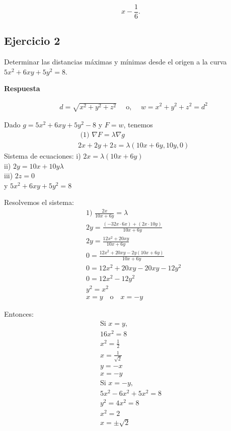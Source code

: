 \documentclass{report}
\begin{document}
\[
x - \frac{1}{6}.
\]

\newpage\subsection{Ejercicio 2}
Determinar las distancias máximas y mínimas desde el origen a la curva $5 x^{2}+6 x y+5 y^{2}=8$.

\textbf{Respuesta}

$$
\begin{aligned}
& d=\sqrt{x^{2}+y^{2}+z^{2}} \quad \text { o, } \quad w=x^{2}+y^{2}+z^{2}=d^{2}
\end{aligned}
$$

Dado $g=5 x^{2}+6 x y+5 y^{2}-8$ y $F=w$, tenemos 
$$
\begin{aligned}
& \text { (1) } \nabla F = \lambda \nabla g \\
& 2x+2y+2z = \lambda (10x + 6y, 10y, 0)
\end{aligned}
$$
Sistema de ecuaciones:
i) $2x = \lambda (10x + 6y)$ \\
ii) $2y = 10x + 10y\lambda$ \\
iii) $2z = 0$ \\ 
y $5x^2 + 6xy + 5y^2 = 8$

Resolvemos el sistema:
$$
\begin{aligned}
& \text{1) } \frac{2x}{10x + 6y} = \lambda \\
& 2y = \frac{(-32x \cdot 6x) + (2x \cdot 10y)}{10x + 6y} \\
& 2y = \frac{12x^2 + 20xy}{10x + 6y} \\
& 0 = \frac{12x^2 + 20xy - 2y(10x + 6y)}{10x + 6y} \\
& 0 = 12x^2 + 20xy - 20xy - 12y^2 \\
& 0 = 12x^2 - 12y^2 \\
& y^2 = x^2 \\
& x = y \quad \text{o} \quad x = -y
\end{aligned}
$$

Entonces:
$$
\begin{gathered}
\text{Si } x = y, \\
16x^2 = 8 \\
x^2 = \frac{1}{2} \\
x = \frac{1}{\sqrt{2}} \\
y = -x \\
x = -y \\
\text{Si } x = -y, \\
5x^2 - 6x^2 + 5x^2 = 8 \\
y^2 = 4x^2 = 8 \\
x^2 = 2 \\
x = \pm \sqrt{2}
\end{gathered}
$$
\end{document}
